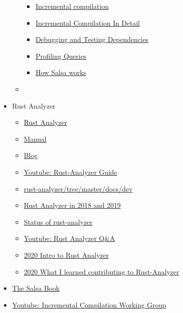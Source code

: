 \documentclass[10pt, a4paper]{report}
\begin{document}
\begin{itemize}[noitemsep]
\begin{itemize}[noitemsep]
\begin{itemize}[noitemsep]
		\item \href{https://rustc-dev-guide.rust-lang.org/queries/incremental-compilation.html}{Incremental compilation}
		\item \href{https://rustc-dev-guide.rust-lang.org/queries/incremental-compilation-in-detail.html}{Incremental Compilation In Detail}
		\item \href{https://rustc-dev-guide.rust-lang.org/incrcomp-debugging.html}{Debugging and Testing Dependencies}
		\item \href{https://rustc-dev-guide.rust-lang.org/queries/profiling.html}{Profiling Queries}
		\item \href{https://rustc-dev-guide.rust-lang.org/salsa.html}{How Salsa works}
		\end{itemize}
	\item \href{}{}
	\end{itemize}
\item Rust Analyzer
	\begin{itemize}[noitemsep]
	\item \href{https://rust-analyzer.github.io/}{Rust Analyzer}
	\item \href{https://rust-analyzer.github.io/manual.html}{Manual}
	\item \href{https://rust-analyzer.github.io/blog}{Blog}
	\item \href{https://youtu.be/ANKBNiSWyfc}{Youtube: Rust-Analyzer Guide}
	\item \href{https://github.com/rust-analyzer/rust-analyzer/tree/master/docs/dev}{rust-analyzer/tree/master/docs/dev}
	\item \href{https://ferrous-systems.com/blog/rust-analyzer-2019/}{Rust Analyzer in 2018 and 2019}
	\item \href{https://ferrous-systems.com/blog/rust-analyzer-status-opencollective/}{Status of rust-analyzer}
	\item \href{https://www.youtube.com/playlist?list=PLXajQV_H-DxLMBt0amcuxgTeOTj6L-YGl}{Youtube: Rust Analyzer Q\&A}
	\item \href{https://blog.logrocket.com/intro-to-rust-analyzer/}{2020 Intro to Rust Analyzer}
	\item \href{https://dev.to/bnjjj/what-i-learned-contributing-to-rust-analyzer-4c7e}{2020 What I learned contributing to Rust-Analyzer}
	\end{itemize}
\item \href{https://salsa-rs.github.io/salsa/}{The Salsa Book}
\item \href{https://www.youtube.com/playlist?list=PL85XCvVPmGQh0P_VEPVM2ZIlBwl4MQMNY}{Youtube: Incremental Compilation Working Group}

\end{itemize}
\end{document}

